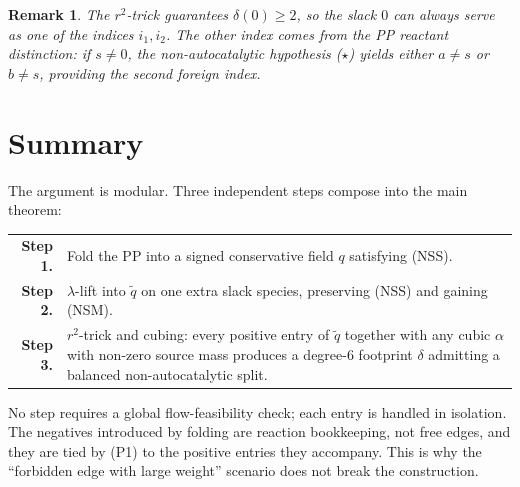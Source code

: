 \documentclass[11pt]{article}
\newtheorem{remark}[theorem]{Remark}
\begin{document}
\begin{remark}
The $r^2$-trick guarantees $\delta(0) \ge 2$, so the slack $0$ can
always serve as one of the indices $i_1, i_2$. The other index comes
from the PP reactant distinction: if $s \ne 0$, the non-autocatalytic
hypothesis ($\star$) yields either $a \ne s$ or $b \ne s$, providing
the second foreign index.
\end{remark}

\section{Summary}

The argument is modular. Three independent steps compose into the
main theorem:

\begin{center}
\begin{tabular}{r p{}}
\textbf{Step 1.} & Fold the PP into a signed conservative field $q$
satisfying (NSS). \\[2pt]
\textbf{Step 2.} & $\lambda$-lift into $\widetilde q$ on one extra slack
species, preserving (NSS) and gaining (NSM). \\[2pt]
\textbf{Step 3.} & $r^2$-trick and cubing: every positive entry of
$\widetilde q$ together with any cubic $\alpha$ with non-zero source
mass produces a degree-$6$ footprint $\delta$ admitting a balanced
non-autocatalytic split.
\end{tabular}
\end{center}

No step requires a global flow-feasibility check; each entry is
handled in isolation. The negatives introduced by folding are reaction
bookkeeping, not free edges, and they are tied by (P1) to the positive
entries they accompany. This is why the ``forbidden edge with large
weight'' scenario does not break the construction.
\end{document}
